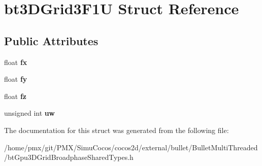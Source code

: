 \hypertarget{structbt3DGrid3F1U}{}\section{bt3\+D\+Grid3\+F1U Struct Reference}
\label{structbt3DGrid3F1U}
\subsection*{Public Attributes}
\begin{DoxyCompactItemize}
\item 
\mbox{\label{structbt3DGrid3F1U_a5e1e6c6a20f65a50259b8c44082eca3f}} 
float {\bfseries fx}
\item 
\mbox{\label{structbt3DGrid3F1U_adfcada84eac79f91d37f817762770e56}} 
float {\bfseries fy}
\item 
\mbox{\label{structbt3DGrid3F1U_a1cec9f965c5d5bfad96347fe45c7bc91}} 
float {\bfseries fz}
\item 
\mbox{\label{structbt3DGrid3F1U_ad8909c1bc5646a40ce03af11851a1004}} 
unsigned int {\bfseries uw}
\end{DoxyCompactItemize}


The documentation for this struct was generated from the following file\+:\begin{DoxyCompactItemize}
\item 
/home/pmx/git/\+P\+M\+X/\+Simu\+Cocos/cocos2d/external/bullet/\+Bullet\+Multi\+Threaded/bt\+Gpu3\+D\+Grid\+Broadphase\+Shared\+Types.\+h\end{DoxyCompactItemize}

